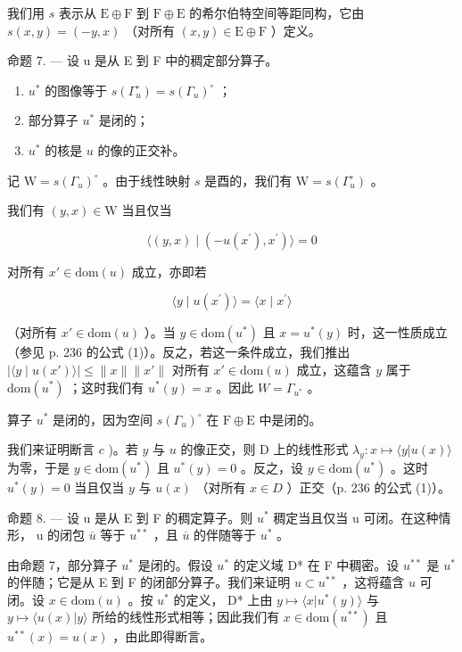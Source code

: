 我们用 \(s\) 表示从 \(\mathrm{E} \oplus \mathrm{F}\) 到 \(\mathrm{F} \oplus \mathrm{E}\) 的希尔伯特空间等距同构，它由 \(s(x, y) = (-y, x)\) （对所有 \((x, y) \in \mathrm{E} \oplus \mathrm{F}\) ）定义。

命题 7. --- 设 u 是从 E 到 F 中的稠定部分算子。

\begin{enumerate}
\def\labelenumi{\alph{enumi})}
\item
  \(u^{*}\) 的图像等于 \(s(\Gamma_{u}^{\circ}) = s(\Gamma_{u})^{\circ}\) ；
\item
  部分算子 \(u^{*}\) 是闭的；
\item
  \(u^{*}\) 的核是 \(u\) 的像的正交补。
\end{enumerate}

记 \(\mathrm{W} = s(\Gamma_u)^\circ\) 。由于线性映射 \(s\) 是酉的，我们有 \(\mathrm{W} = s(\Gamma_u^\circ)\) 。

我们有 \((y,x)\in \mathrm{W}\) 当且仅当

\[
\langle (y, x) \mid (- u (x ^ {\prime}), x ^ {\prime}) \rangle = 0
\]

对所有 \(x' \in \mathrm{dom}(u)\) 成立，亦即若

\[
\langle y \mid u (x ^ {\prime}) \rangle = \langle x \mid x ^ {\prime} \rangle
\]

（对所有 \(x' \in \text{dom}(u)\) ）。当 \(y \in \text{dom}(u^{*})\) 且 \(x = u^{*}(y)\) 时，这一性质成立（参见 p. 236 的公式 (1)）。反之，若这一条件成立，我们推出 \(|\langle y \mid u(x') \rangle| \leqslant \|x\| \|x'\|\) 对所有 \(x' \in \text{dom}(u)\) 成立，这蕴含 \(y\) 属于 \(\text{dom}(u^*)\) ；这时我们有 \(u^*(y) = x\) 。因此 \(W = \Gamma_{u^*}\) 。

算子 \(u^{*}\) 是闭的，因为空间 \(s(\Gamma_{u})^{\circ}\) 在 \(\mathrm{F} \oplus \mathrm{E}\) 中是闭的。

我们来证明断言 \(c\) )。若 \(y\) 与 \(u\) 的像正交，则 D 上的线性形式 \(\lambda_y: x \mapsto \langle y | u(x) \rangle\) 为零，于是 \(y \in \text{dom}(u^*)\) 且 \(u^*(y) = 0\) 。反之，设 \(y \in \text{dom}(u^*)\) 。这时 \(u^*(y) = 0\) 当且仅当 \(y\) 与 \(u(x)\) （对所有 \(x \in D\) ）正交（p. 236 的公式 (1)）。

命题 8. --- 设 u 是从 E 到 F 的稠定算子。则 \(u^{*}\) 稠定当且仅当 u 可闭。在这种情形， u 的闭包 \(\overline{u}\) 等于 \(u^{**}\) ，且 \(\overline{u}\) 的伴随等于 \(u^{*}\) 。

由命题 7，部分算子 \(u^*\) 是闭的。假设 \(u^*\) 的定义域 D* 在 F 中稠密。设 \(u^{**}\) 是 \(u^*\) 的伴随；它是从 E 到 F 的闭部分算子。我们来证明 \(u \subset u^{**}\) ，这将蕴含 \(u\) 可闭。设 \(x \in \text{dom}(u)\) 。按 \(u^*\) 的定义， D* 上由 \(y \mapsto \langle x | u^*(y) \rangle\) 与 \(y \mapsto \langle u(x) | y \rangle\) 所给的线性形式相等；因此我们有 \(x \in \text{dom}(u^{**})\) 且 \(u^{**}(x) = u(x)\) ，由此即得断言。

